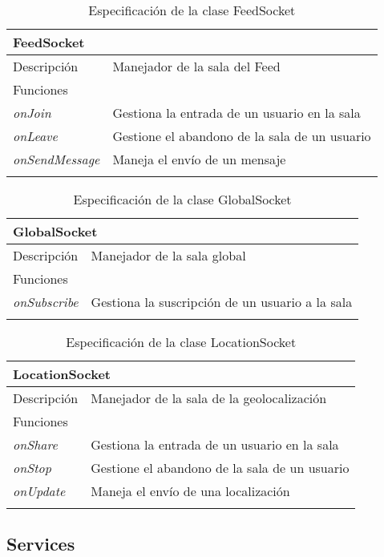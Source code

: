 \vspace{-20pt}
\begin{longtable}{|p{} p{}|}
    \hline
    \multicolumn{2}{|l|}{FeedSocket} \\ \hline \hline
    Descripción      & Manejador de la sala del Feed \\ \hline
    \multicolumn{2}{|l|}{Funciones} \\
    \emph{onJoin}  & Gestiona la entrada de un usuario en la sala  \\
    \emph{onLeave}  & Gestione el abandono de la sala de un usuario  \\
    \emph{onSendMessage}  & Maneja el envío de un mensaje  \\ \hline
    \caption{Especificación de la clase FeedSocket}
    \label{class:api:feed_socket}
\end{longtable}

\newpage
\begin{longtable}{|p{} p{}|}
    \hline
    \multicolumn{2}{|l|}{GlobalSocket} \\ \hline \hline
    Descripción      & Manejador de la sala global \\ \hline
    \multicolumn{2}{|l|}{Funciones} \\
    \emph{onSubscribe}  & Gestiona la suscripción de un usuario a la sala \\ \hline
    \caption{Especificación de la clase GlobalSocket}
    \label{class:api:global_socket}
\end{longtable}

\begin{longtable}{|p{} p{}|}
    \hline
    \multicolumn{2}{|l|}{LocationSocket} \\ \hline \hline
    Descripción      & Manejador de la sala de la geolocalización \\ \hline
    \multicolumn{2}{|l|}{Funciones} \\
    \emph{onShare}  & Gestiona la entrada de un usuario en la sala  \\
    \emph{onStop}  & Gestione el abandono de la sala de un usuario  \\
    \emph{onUpdate}  & Maneja el envío de una localización  \\ \hline
    \caption{Especificación de la clase LocationSocket}
    \label{class:api:location_socket}
\end{longtable}

\subsection{Services}

